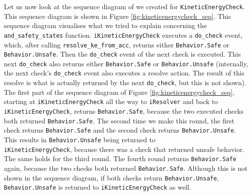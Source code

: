 \documentclass[12pt]{scrreprt}
\begin{document}
\begin{appendices}
Let us now look at the sequence diagram of we created for \texttt{KineticEnergyCheck}. This sequence diagram is shown in Figure \ref{fig:kineticenergycheck_seq}. This sequence diagram visualises what we tried to explain concerning the \texttt{and\_safety\_states} function. \texttt{iKineticEnergyCheck} executes a \texttt{do\_check} event, which, after calling \texttt{resolve\_ke\_from\_acc}, returns either \texttt{Behavior.Safe} or \texttt{Behavior.Unsafe}. Then the \texttt{do\_check} event of the next check is executed. This next \texttt{do\_check} also returns either \texttt{Behavior.Safe} or \texttt{Behavior.Unsafe} (internally, the next check's \texttt{do\_check} event also executes a resolve action. The result of this resolve is what is actually returned by the next \texttt{do\_check}, but this is not shown). The first part of the sequence diagram of Figure \ref{fig:kineticenergycheck_seq}, starting at \texttt{iKineticEnergyCheck} all the way to \texttt{iResolver} and back to \texttt{iKineticEnergyCheck}, returns \texttt{Behavior.Safe}, because the two executed checks both returned \texttt{Behavior.Safe}. The second time we make this round, the first check returns \texttt{Behavior.Safe} and the second check returns \texttt{Behavior.Unsafe}. This results in \texttt{Behavior.Unsafe} being returned to\\\texttt{iKineticEnergyCheck}, because there was a check that returned unsafe behavior. The same holds for the third round. The fourth round returns \texttt{Behavior.Safe} again, because the two checks both returned \texttt{Behavior.Safe}. Although this is not shown in the sequence diagram, if both checks return \texttt{Behavior.Unsafe}, \texttt{Behavior.Unsafe} is returned to \texttt{iKineticEnergyCheck} as well.


\end{appendices}
\end{document}
